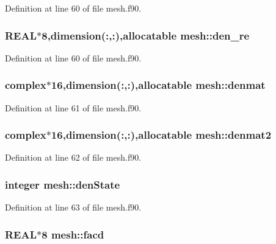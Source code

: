 Definition at line 60 of file mesh.f90.

\hypertarget{namespacemesh_af15f870e8317605924334a07ecfe3b28}{
\subsubsection[{den\_\-re}]{\setlength{\rightskip}{0pt plus 5cm}REAL$\ast$8,dimension(:,:),allocatable {\bf mesh::den\_\-re}}}
\label{namespacemesh_af15f870e8317605924334a07ecfe3b28}


Definition at line 60 of file mesh.f90.

\hypertarget{namespacemesh_ad78af6f9bdcc56004176e07e81d419f8}{
\subsubsection[{denmat}]{\setlength{\rightskip}{0pt plus 5cm}complex$\ast$16,dimension(:,:),allocatable {\bf mesh::denmat}}}
\label{namespacemesh_ad78af6f9bdcc56004176e07e81d419f8}


Definition at line 61 of file mesh.f90.

\hypertarget{namespacemesh_ac1de4684ee911518c05caaa4c6dcf484}{
\subsubsection[{denmat2}]{\setlength{\rightskip}{0pt plus 5cm}complex$\ast$16,dimension(:,:),allocatable {\bf mesh::denmat2}}}
\label{namespacemesh_ac1de4684ee911518c05caaa4c6dcf484}


Definition at line 62 of file mesh.f90.

\hypertarget{namespacemesh_a451ed2546542175ea54b5c9a780b5462}{
\subsubsection[{denState}]{\setlength{\rightskip}{0pt plus 5cm}integer {\bf mesh::denState}}}
\label{namespacemesh_a451ed2546542175ea54b5c9a780b5462}


Definition at line 63 of file mesh.f90.

\hypertarget{namespacemesh_a43130e9d2b4c80b7862ea7d6226a7a4d}{
\subsubsection[{facd}]{\setlength{\rightskip}{0pt plus 5cm}REAL$\ast$8 {\bf mesh::facd}}}
\label{namespacemesh_a43130e9d2b4c80b7862ea7d6226a7a4d}



